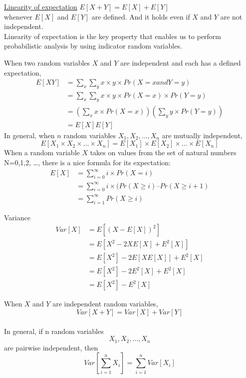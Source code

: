\documentclass{article}
\begin{document}
\underline{Linearity of expectation}
$E[X+Y]=E[X]+E[Y]$ \\
whenever $E[X]$ and $E[Y]$ are defined. And it holds even if $X$ and $Y$ are not independent.\\
Linearity of expectation is the key property that enables us to perform probabilistic analysis by using indicator random variables.

When two random variables $X$ and $Y$ are independent and each has a defined expectation,
\begin{equation}
\begin{aligned}
E[XY]
&=\sum_x\sum_y x \times y \times Pr(X=x and Y=y) \\
&=\sum_x\sum_y x \times y \times Pr(X=x) \times Pr(Y=y)\\
&=(\sum_x x \times Pr(X=x))(\sum_y y \times Pr(Y=y))\\
&=E[X]E[Y]
\end{aligned}
\end{equation}
In general, when $n$ random variables $X_1, X_2, \ldots, X_n$ are mutually independent,
$$
E[X_1 \times X_2 \times \ldots \times X_n]=E[X_1] \times E[X_2] \times \ldots \times E[X_n]
$$
When a random variable $X$ takes on values from the set of natural numbers N={0,1,2, \ldots}, there is a nice formula for its expectation:
\begin{equation}
\begin{aligned}
E[X]
&=\sum_{i=0}^{\infty} i \times Pr(X=i)\\
&=\sum_{i=0}^{\infty} i \times (Pr(X \geq i) – Pr(X \geq i+1)\\
&=\sum_{i=1}^{\infty} Pr(X \geq i)
\end{aligned}
\end{equation}

Variance
\begin{equation}
\begin{aligned}
Var[X]
&=E[(X-E[X])^2] \\
&=E[X^2-2XE[X]+E^2[X]]\\
&=E[X^2]-2E[XE[X]]+E^2[X]\\
&=E[X^2]-2E^2[X]+E^2[X]\\
&=E[X^2]-E^2[X]
\end{aligned}
\end{equation}

When $X$ and $Y$ are independent random variables,\\
$$Var[X+Y]=Var[X] + Var[Y]$$\\
In general, if n random variables $$X_1, X_2, \ldots, X_n$$ are pairwise independent, then
$$Var[\sum_{i=1}^n X_i]= \sum_{i=1}^n Var[X_i]$$
\end{document}
